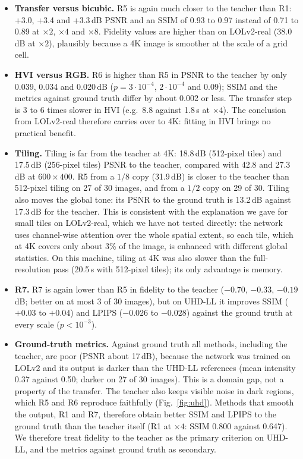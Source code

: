\documentclass[runningheads]{llncs}
\begin{document}
\begin{itemize}
\item \textbf{Transfer versus bicubic.} R5 is again much closer to the teacher than R1: +3.0, +3.4 and +3.3\,dB PSNR and an SSIM of 0.93 to 0.97 instead of 0.71 to 0.89 at $\times2$, $\times4$ and $\times8$. Fidelity values are higher than on LOLv2-real (38.0\,dB at $\times2$), plausibly because a 4K image is smoother at the scale of a grid cell.
\item \textbf{HVI versus RGB.} R6 is higher than R5 in PSNR to the teacher by only 0.039, 0.034 and 0.020\,dB ($p=3\cdot10^{-4}$, $2\cdot10^{-4}$ and $0.09$); SSIM and the metrics against ground truth differ by about 0.002 or less. The transfer step is 3 to 6 times slower in HVI (e.g.\ 8.8 against 1.8\,s at $\times4$). The conclusion from LOLv2-real therefore carries over to 4K: fitting in HVI brings no practical benefit.
\item \textbf{Tiling.} Tiling is far from the teacher at 4K: 18.8\,dB (512-pixel tiles) and 17.5\,dB (256-pixel tiles) PSNR to the teacher, compared with 42.8 and 27.3\,dB at $600{\times}400$. R5 from a $1/8$ copy (31.9\,dB) is closer to the teacher than 512-pixel tiling on 27 of 30 images, and from a $1/2$ copy on 29 of 30. Tiling also moves the global tone: its PSNR to the ground truth is 13.2\,dB against 17.3\,dB for the teacher. This is consistent with the explanation we gave for small tiles on LOLv2-real, which we have not tested directly: the network uses channel-wise attention over the whole spatial extent, so each tile, which at 4K covers only about 3\% of the image, is enhanced with different global statistics. On this machine, tiling at 4K was also slower than the full-resolution pass (20.5\,s with 512-pixel tiles); its only advantage is memory.
\item \textbf{R7.} R7 is again lower than R5 in fidelity to the teacher ($-0.70$, $-0.33$, $-0.19$\,dB; better on at most 3 of 30 images), but on UHD-LL it improves SSIM ($+0.03$ to $+0.04$) and LPIPS ($-0.026$ to $-0.028$) against the ground truth at every scale ($p<10^{-3}$).
\item \textbf{Ground-truth metrics.} Against ground truth all methods, including the teacher, are poor (PSNR about 17\,dB), because the network was trained on LOLv2 and its output is darker than the UHD-LL references (mean intensity 0.37 against 0.50; darker on 27 of 30 images). This is a domain gap, not a property of the transfer. The teacher also keeps visible noise in dark regions, which R5 and R6 reproduce faithfully (Fig.~\ref{fig:uhd}). Methods that smooth the output, R1 and R7, therefore obtain better SSIM and LPIPS to the ground truth than the teacher itself (R1 at $\times4$: SSIM 0.800 against 0.647). We therefore treat fidelity to the teacher as the primary criterion on UHD-LL, and the metrics against ground truth as secondary.
\end{itemize}
\end{document}
